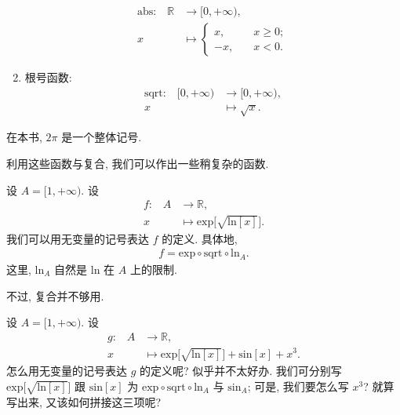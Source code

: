 \begin{definition}
\begin{enumerate}
\begin{align*}
                  \text{$\mathrm{abs}$:} \quad
                  \mathbb{R} & \to [0, +\infty),             \\
                  x          & \mapsto \begin{cases}
                                           x,  & \quad x \geq 0; \\
                                           -x, & \quad x < 0.
                                       \end{cases}
              \end{align*}
        \item 根号函数:
              \begin{align*}
                  \text{$\mathrm{sqrt}$:} \quad
                  [0, +\infty) & \to [0, +\infty), \\
                  x            & \mapsto \sqrt{x}.
              \end{align*}
    \end{enumerate}
\end{definition}

\begin{remark}
    在本书, $2\pi$ 是一个整体记号.
\end{remark}

利用这些函数与复合, 我们可以作出一些稍复杂的函数.

\begin{example}
    设 $A = [1, +\infty)$. 设
    \begin{align*}
        \text{$f$:} \quad
        A & \to \mathbb{R},                                                \\
        x & \mapsto \mathrm{exp} {\bigg[ \sqrt{\mathrm{ln} {[x]}} \bigg]}.
    \end{align*}
    我们可以用无变量的记号表达 $f$ 的定义. 具体地,
    \begin{align*}
        f = \mathrm{exp} \circ \mathrm{sqrt} \circ \mathrm{ln}_{A}.
    \end{align*}
    这里, $\mathrm{ln}_{A}$ 自然是 $\mathrm{ln}$ 在 $A$ 上的限制.
\end{example}

不过, 复合并不够用.

\begin{example}
    设 $A = [1, +\infty)$. 设
    \begin{align*}
        \text{$g$:} \quad
        A & \to \mathbb{R},                                                                           \\
        x & \mapsto \mathrm{exp} {\bigg[ \sqrt{\mathrm{ln} {[x]}} \bigg]} + \mathrm{sin} {[x]} + x^3.
    \end{align*}
    怎么用无变量的记号表达 $g$ 的定义呢? 似乎并不太好办. 我们可分别写 $\mathrm{exp} {\bigg[ \sqrt{\mathrm{ln} {[x]}} \bigg]}$ 跟 $\mathrm{sin} {[x]}$ 为 $\mathrm{exp} \circ \mathrm{sqrt} \circ \mathrm{ln}_{A}$ 与 $\mathrm{sin}_A$; 可是, 我们要怎么写 $x^3$? 就算写出来, 又该如何拼接这三项呢?
\end{example}

